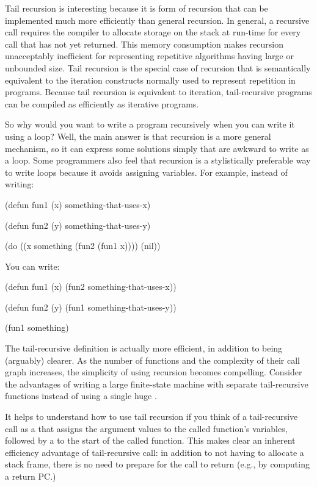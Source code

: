 Tail recursion is interesting because it is form of recursion that can be
implemented much more efficiently than general recursion.  In general, a
recursive call requires the compiler to allocate storage on the stack at
run-time for every call that has not yet returned.  This memory consumption
makes recursion unacceptably inefficient for representing repetitive algorithms
having large or unbounded size.  Tail recursion is the special case of
recursion that is semantically equivalent to the iteration constructs normally
used to represent repetition in programs.  Because tail recursion is equivalent
to iteration, tail-recursive programs can be compiled as efficiently as
iterative programs.

So why would you want to write a program recursively when you can write it
using a loop?  Well, the main answer is that recursion is a more general
mechanism, so it can express some solutions simply that are awkward to write as
a loop.  Some programmers also feel that recursion is a stylistically
preferable way to write loops because it avoids assigning variables.
For example, instead of writing:
\begin{lisp}
(defun fun1 (x)
  something-that-uses-x)

(defun fun2 (y)
  something-that-uses-y)

(do ((x something (fun2 (fun1 x))))
    (nil))
\end{lisp}
You can write:
\begin{lisp}
(defun fun1 (x)
  (fun2 something-that-uses-x))

(defun fun2 (y)
  (fun1 something-that-uses-y))

(fun1 something)
\end{lisp}
The tail-recursive definition is actually more efficient, in addition to being
(arguably) clearer.  As the number of functions and the complexity of their
call graph increases, the simplicity of using recursion becomes compelling.
Consider the advantages of writing a large finite-state machine with separate
tail-recursive functions instead of using a single huge .

It helps to understand how to use tail recursion if you think of a
tail-recursive call as a  that assigns the argument values to the
called function's variables, followed by a  to the start of the called
function.  This makes clear an inherent efficiency advantage of tail-recursive
call: in addition to not having to allocate a stack frame, there is no need to
prepare for the call to return (e.g., by computing a return PC.)

